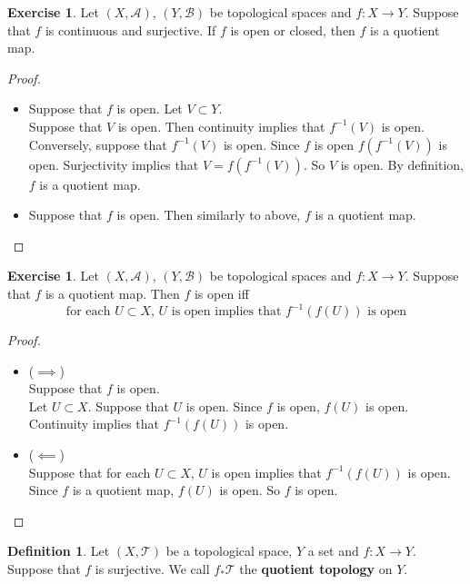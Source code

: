 \documentclass[12pt]{amsart}
\theoremstyle{definition}
\newtheorem{defn}[definition]{Definition}
\newtheorem{ex}[definition]{Exercise}
\newcommand{\MA}{\mathcal{A}}
\newcommand{\MB}{\mathcal{B}}
\newcommand{\MT}{\mathcal{T}}
\newcommand{\lex}[1]{\label{ex:#1}}
\newcommand{\ld}[1]{\label{defn:#1}}
\begin{document}
	\begin{ex} \lex{34004}
	Let $(X, \MA)$, $(Y, \MB)$ be topological spaces and $f:X \rightarrow Y$. Suppose that $f$ is continuous and surjective. If $f$ is open or closed, then $f$ is a quotient map. 
	\end{ex}
	
	\begin{proof}\
	\begin{itemize}	
	\item Suppose that $f$ is open. Let $V \subset Y$. \\
	Suppose that $V$ is open. Then continuity implies that $f^{-1}(V)$ is open. Conversely, suppose that $f^{-1}(V)$ is open. Since $f$ is open $f(f^{-1}(V))$ is open. Surjectivity implies that $V = f(f^{-1}(V))$. So $V$ is open. By definition, $f$ is a quotient map.\\
	\item   
	Suppose that $f$ is open. Then similarly to above, $f$ is a quotient map.
	\end{itemize}
	\end{proof}
	
	\begin{ex} \lex{34005}
	Let $(X, \MA)$, $(Y, \MB)$ be topological spaces and $f:X \rightarrow Y$. Suppose that $f$ is a quotient map. Then $f$ is open iff 
	\begin{equation*}
	\text{for each $U \subset X$, $U$ is open implies that $f^{-1}(f(U))$ is open} 
	\end{equation*}
	\end{ex}
	
	\begin{proof}\
	\begin{itemize}	
	\item ($\implies$) \\
	Suppose that $f$ is open.\\
	Let $U \subset X$. Suppose that $U$ is open. Since $f$ is open, $f(U)$ is open. Continuity implies that $f^{-1}(f(U))$ is open.\\ 
	\item ($\impliedby$) \\
	Suppose that for each $U \subset X$, $U$ is open implies that $f^{-1}(f(U))$ is open. \\
	Since $f$ is a quotient map, $f(U)$ is open. So $f$ is open.
	
	\end{itemize}
	\end{proof}
	
	
	\begin{defn} \ld{34006}
	Let $(X, \MT)$ be a topological space, $Y$ a set and $f:X \rightarrow Y$. Suppose that $f$ is surjective.	
	 We call $f_* \MT$ the \textbf{quotient topology} on $Y$.  
	\end{defn}
	
\end{document}
